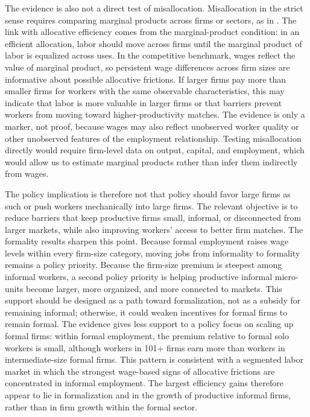 The evidence is also not a direct test of misallocation. Misallocation in the strict sense requires comparing marginal products across firms or sectors, as in \citet{hsieh2009misallocation}. The link with allocative efficiency comes from the marginal-product condition: in an efficient allocation, labor should move across firms until the marginal product of labor is equalized across uses. In the competitive benchmark, wages reflect the value of marginal product, so persistent wage differences across firm sizes are informative about possible allocative frictions. If larger firms pay more than smaller firms for workers with the same observable characteristics, this may indicate that labor is more valuable in larger firms or that barriers prevent workers from moving toward higher-productivity matches. The evidence is only a marker, not proof, because wages may also reflect unobserved worker quality or other unobserved features of the employment relationship. Testing misallocation directly would require firm-level data on output, capital, and employment, which would allow us to estimate marginal products rather than infer them indirectly from wages.

The policy implication is therefore not that policy should favor large firms as such or push workers mechanically into large firms. The relevant objective is to reduce barriers that keep productive firms small, informal, or disconnected from larger markets, while also improving workers' access to better firm matches. The formality results sharpen this point. Because formal employment raises wage levels within every firm-size category, moving jobs from informality to formality remains a policy priority. Because the firm-size premium is steepest among informal workers, a second policy priority is helping productive informal micro-units become larger, more organized, and more connected to markets. This support should be designed as a path toward formalization, not as a subsidy for remaining informal; otherwise, it could weaken incentives for formal firms to remain formal. The evidence gives less support to a policy focus on scaling up formal firms: within formal employment, the premium relative to formal solo workers is small, although workers in 101+ firms earn more than workers in intermediate-size formal firms. This pattern is consistent with a segmented labor market in which the strongest wage-based signs of allocative frictions are concentrated in informal employment. The largest efficiency gains therefore appear to lie in formalization and in the growth of productive informal firms, rather than in firm growth within the formal sector.
